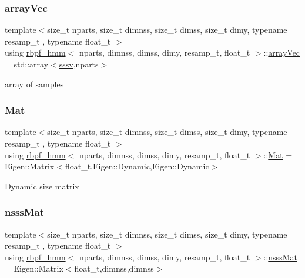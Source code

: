 \subsubsection{\texorpdfstring{array\+Vec}{arrayVec}}
{\footnotesize\ttfamily template$<$size\+\_\+t nparts, size\+\_\+t dimnss, size\+\_\+t dimss, size\+\_\+t dimy, typename resamp\+\_\+t , typename float\+\_\+t $>$ \\
using \hyperlink{classrbpf__hmm}{rbpf\+\_\+hmm}$<$ nparts, dimnss, dimss, dimy, resamp\+\_\+t, float\+\_\+t $>$\+::\hyperlink{classrbpf__hmm_a2154906d47b4eb987fe7c238d1aace0a}{array\+Vec} =  std\+::array$<$\hyperlink{classrbpf__hmm_a28e8ad1d93bcf53cb74603f74826a81c}{sssv},nparts$>$}

array of samples \mbox{\label{classrbpf__hmm_ac32aaf9833767d6886f732243a77aa66}} 
\subsubsection{\texorpdfstring{Mat}{Mat}}
{\footnotesize\ttfamily template$<$size\+\_\+t nparts, size\+\_\+t dimnss, size\+\_\+t dimss, size\+\_\+t dimy, typename resamp\+\_\+t , typename float\+\_\+t $>$ \\
using \hyperlink{classrbpf__hmm}{rbpf\+\_\+hmm}$<$ nparts, dimnss, dimss, dimy, resamp\+\_\+t, float\+\_\+t $>$\+::\hyperlink{classrbpf__hmm_ac32aaf9833767d6886f732243a77aa66}{Mat} =  Eigen\+::\+Matrix$<$float\+\_\+t,Eigen\+::\+Dynamic,Eigen\+::\+Dynamic$>$}

Dynamic size matrix \mbox{\label{classrbpf__hmm_a7ae942768da71581665168d3c3063c3f}} 
\subsubsection{\texorpdfstring{nsss\+Mat}{nsssMat}}
{\footnotesize\ttfamily template$<$size\+\_\+t nparts, size\+\_\+t dimnss, size\+\_\+t dimss, size\+\_\+t dimy, typename resamp\+\_\+t , typename float\+\_\+t $>$ \\
using \hyperlink{classrbpf__hmm}{rbpf\+\_\+hmm}$<$ nparts, dimnss, dimss, dimy, resamp\+\_\+t, float\+\_\+t $>$\+::\hyperlink{classrbpf__hmm_a7ae942768da71581665168d3c3063c3f}{nsss\+Mat} =  Eigen\+::\+Matrix$<$float\+\_\+t,dimnss,dimnss$>$}

